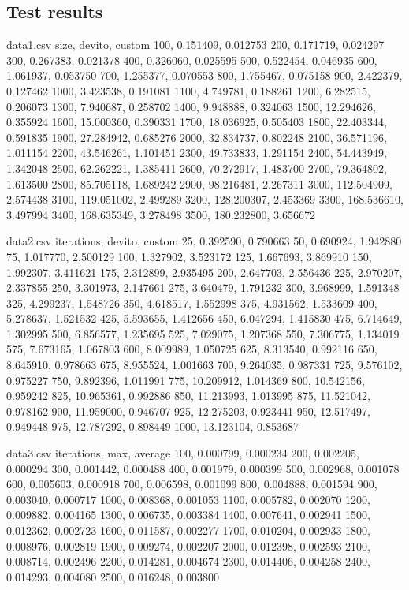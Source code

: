 \documentclass{article}
\begin{document}
\subsection*{Test results}
\begin{filecontents*}{data1.csv}
	size, devito, custom
	100, 0.151409, 0.012753
	200, 0.171719, 0.024297
	300, 0.267383, 0.021378
	400, 0.326060, 0.025595
	500, 0.522454, 0.046935
	600, 1.061937, 0.053750
	700, 1.255377, 0.070553
	800, 1.755467, 0.075158
	900, 2.422379, 0.127462
	1000, 3.423538, 0.191081
	1100, 4.749781, 0.188261
	1200, 6.282515, 0.206073
	1300, 7.940687, 0.258702
	1400, 9.948888, 0.324063
	1500, 12.294626, 0.355924
	1600, 15.000360, 0.390331
	1700, 18.036925, 0.505403
	1800, 22.403344, 0.591835
	1900, 27.284942, 0.685276
	2000, 32.834737, 0.802248
	2100, 36.571196, 1.011154
	2200, 43.546261, 1.101451
	2300, 49.733833, 1.291154
	2400, 54.443949, 1.342048
	2500, 62.262221, 1.385411
	2600, 70.272917, 1.483700
	2700, 79.364802, 1.613500
	2800, 85.705118, 1.689242
	2900, 98.216481, 2.267311
	3000, 112.504909, 2.574438
	3100, 119.051002, 2.499289
	3200, 128.200307, 2.453369
	3300, 168.536610, 3.497994
	3400, 168.635349, 3.278498
	3500, 180.232800, 3.656672
\end{filecontents*}
\begin{filecontents*}{data2.csv}
	iterations, devito, custom
	25, 0.392590, 0.790663
	50, 0.690924, 1.942880
	75, 1.017770, 2.500129
	100, 1.327902, 3.523172
	125, 1.667693, 3.869910
	150, 1.992307, 3.411621
	175, 2.312899, 2.935495
	200, 2.647703, 2.556436
	225, 2.970207, 2.337855
	250, 3.301973, 2.147661
	275, 3.640479, 1.791232
	300, 3.968999, 1.591348
	325, 4.299237, 1.548726
	350, 4.618517, 1.552998
	375, 4.931562, 1.533609
	400, 5.278637, 1.521532
	425, 5.593655, 1.412656
	450, 6.047294, 1.415830
	475, 6.714649, 1.302995
	500, 6.856577, 1.235695
	525, 7.029075, 1.207368
	550, 7.306775, 1.134019
	575, 7.673165, 1.067803
	600, 8.009989, 1.050725
	625, 8.313540, 0.992116
	650, 8.645910, 0.978663
	675, 8.955524, 1.001663
	700, 9.264035, 0.987331
	725, 9.576102, 0.975227
	750, 9.892396, 1.011991
	775, 10.209912, 1.014369
	800, 10.542156, 0.959242
	825, 10.965361, 0.992886
	850, 11.213993, 1.013995
	875, 11.521042, 0.978162
	900, 11.959000, 0.946707
	925, 12.275203, 0.923441
	950, 12.517497, 0.949448
	975, 12.787292, 0.898449
	1000, 13.123104, 0.853687
\end{filecontents*}
\begin{filecontents*}{data3.csv}
	iterations, max, average
	100, 0.000799, 0.000234
	200, 0.002205, 0.000294
	300, 0.001442, 0.000488
	400, 0.001979, 0.000399
	500, 0.002968, 0.001078
	600, 0.005603, 0.000918
	700, 0.006598, 0.001099
	800, 0.004888, 0.001594
	900, 0.003040, 0.000717
	1000, 0.008368, 0.001053
	1100, 0.005782, 0.002070
	1200, 0.009882, 0.004165
	1300, 0.006735, 0.003384
	1400, 0.007641, 0.002941
	1500, 0.012362, 0.002723
	1600, 0.011587, 0.002277
	1700, 0.010204, 0.002933
	1800, 0.008976, 0.002819
	1900, 0.009274, 0.002207
	2000, 0.012398, 0.002593
	2100, 0.008714, 0.002496
	2200, 0.014281, 0.004674
	2300, 0.014406, 0.004258
	2400, 0.014293, 0.004080
	2500, 0.016248, 0.003800
\end{filecontents*}
\end{document}

